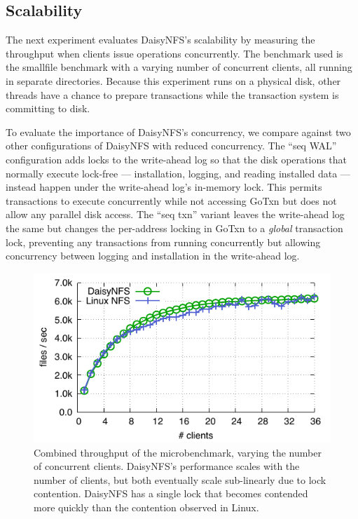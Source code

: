 \subsection{Scalability}

The next experiment evaluates DaisyNFS's scalability by measuring the throughput
when clients issue operations concurrently. The benchmark used is the smallfile
benchmark with a varying number of concurrent clients, all running in separate
directories. Because this experiment runs on a physical disk, other threads have
a chance to prepare transactions while the transaction system is committing to
disk.

To evaluate the importance of DaisyNFS's concurrency, we compare against two
other configurations of DaisyNFS with reduced concurrency. The ``seq WAL'' configuration
adds locks to the write-ahead log so that the disk operations that normally
execute lock-free --- installation, logging, and reading installed data ---
instead happen under the write-ahead log's in-memory lock. This permits
transactions to execute concurrently while not accessing GoTxn but does not
allow any parallel disk access. The ``seq txn'' variant leaves the write-ahead
log the same but changes the per-address locking in GoTxn to a \emph{global}
transaction lock, preventing any transactions from running concurrently but
allowing concurrency between logging and installation in the write-ahead log.

\begin{figure}[ht]
  \centering
  \includegraphics{daisy-nfs/fig/scale.pdf}
  \vspace{0.5\baselineskip}
  \caption[Concurrent smallfile performance]%
  {Combined throughput of the  microbenchmark, varying the number
    of concurrent clients. DaisyNFS's performance scales with the number of
    clients, but both eventually scale sub-linearly due to lock contention. DaisyNFS has a single lock that becomes contended more quickly than the contention observed in Linux.}
  \label{fig:eval:scale}
\end{figure}

